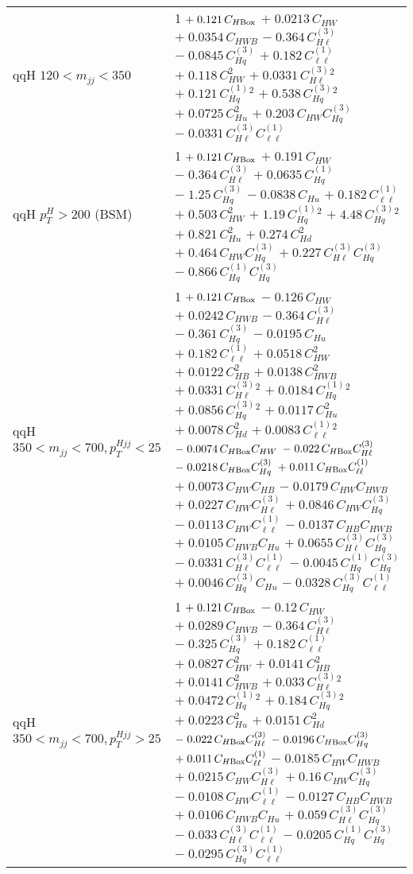 \begin{tabular}{l|p{}}
    qqH $120 < m_{jj} < 350$ & 1 $+\;0.121\,C_{H\rm{Box}}$ $+\;0.0213\,C_{HW}$ $+\;0.0354\,C_{HWB}$ $-\;0.364\,C^{(3)}_{H\ell}$ $-\;0.0845\,C^{(3)}_{Hq}$ $+\;0.182\,C^{(1)}_{\ell\ell}$ $+\;0.118\,C_{HW}^{2}$ $+\;0.0331\,C^{(3)}_{H\ell}^{2}$ $+\;0.121\,C^{(1)}_{Hq}^{2}$ $+\;0.538\,C^{(3)}_{Hq}^{2}$ $+\;0.0725\,C_{Hu}^{2}$ $+\;0.203\,C_{HW}C^{(3)}_{Hq}$ $-\;0.0331\,C^{(3)}_{H\ell}C^{(1)}_{\ell\ell}$ \\
    qqH $p_{T}^{H} > 200$ (BSM) & 1 $+\;0.121\,C_{H\rm{Box}}$ $+\;0.191\,C_{HW}$ $-\;0.364\,C^{(3)}_{H\ell}$ $+\;0.0635\,C^{(1)}_{Hq}$ $-\;1.25\,C^{(3)}_{Hq}$ $-\;0.0838\,C_{Hu}$ $+\;0.182\,C^{(1)}_{\ell\ell}$ $+\;0.503\,C_{HW}^{2}$ $+\;1.19\,C^{(1)}_{Hq}^{2}$ $+\;4.48\,C^{(3)}_{Hq}^{2}$ $+\;0.821\,C_{Hu}^{2}$ $+\;0.274\,C_{Hd}^{2}$ $+\;0.464\,C_{HW}C^{(3)}_{Hq}$ $+\;0.227\,C^{(3)}_{H\ell}C^{(3)}_{Hq}$ $-\;0.866\,C^{(1)}_{Hq}C^{(3)}_{Hq}$ \\
    qqH $350 < m_{jj} < 700, p_{T}^{Hjj} < 25$ & 1 $+\;0.121\,C_{H\rm{Box}}$ $-\;0.126\,C_{HW}$ $+\;0.0242\,C_{HWB}$ $-\;0.364\,C^{(3)}_{H\ell}$ $-\;0.361\,C^{(3)}_{Hq}$ $-\;0.0195\,C_{Hu}$ $+\;0.182\,C^{(1)}_{\ell\ell}$ $+\;0.0518\,C_{HW}^{2}$ $+\;0.0122\,C_{HB}^{2}$ $+\;0.0138\,C_{HWB}^{2}$ $+\;0.0331\,C^{(3)}_{H\ell}^{2}$ $+\;0.0184\,C^{(1)}_{Hq}^{2}$ $+\;0.0856\,C^{(3)}_{Hq}^{2}$ $+\;0.0117\,C_{Hu}^{2}$ $+\;0.0078\,C_{Hd}^{2}$ $+\;0.0083\,C^{(1)}_{\ell\ell}^{2}$ $-\;0.0074\,C_{H\rm{Box}}C_{HW}$ $-\;0.022\,C_{H\rm{Box}}C^{(3)}_{H\ell}$ $-\;0.0218\,C_{H\rm{Box}}C^{(3)}_{Hq}$ $+\;0.011\,C_{H\rm{Box}}C^{(1)}_{\ell\ell}$ $+\;0.0073\,C_{HW}C_{HB}$ $-\;0.0179\,C_{HW}C_{HWB}$ $+\;0.0227\,C_{HW}C^{(3)}_{H\ell}$ $+\;0.0846\,C_{HW}C^{(3)}_{Hq}$ $-\;0.0113\,C_{HW}C^{(1)}_{\ell\ell}$ $-\;0.0137\,C_{HB}C_{HWB}$ $+\;0.0105\,C_{HWB}C_{Hu}$ $+\;0.0655\,C^{(3)}_{H\ell}C^{(3)}_{Hq}$ $-\;0.0331\,C^{(3)}_{H\ell}C^{(1)}_{\ell\ell}$ $-\;0.0045\,C^{(1)}_{Hq}C^{(3)}_{Hq}$ $+\;0.0046\,C^{(3)}_{Hq}C_{Hu}$ $-\;0.0328\,C^{(3)}_{Hq}C^{(1)}_{\ell\ell}$ \\
    qqH $350 < m_{jj} < 700, p_{T}^{Hjj} > 25$ & 1 $+\;0.121\,C_{H\rm{Box}}$ $-\;0.12\,C_{HW}$ $+\;0.0289\,C_{HWB}$ $-\;0.364\,C^{(3)}_{H\ell}$ $-\;0.325\,C^{(3)}_{Hq}$ $+\;0.182\,C^{(1)}_{\ell\ell}$ $+\;0.0827\,C_{HW}^{2}$ $+\;0.0141\,C_{HB}^{2}$ $+\;0.0141\,C_{HWB}^{2}$ $+\;0.033\,C^{(3)}_{H\ell}^{2}$ $+\;0.0472\,C^{(1)}_{Hq}^{2}$ $+\;0.184\,C^{(3)}_{Hq}^{2}$ $+\;0.0223\,C_{Hu}^{2}$ $+\;0.0151\,C_{Hd}^{2}$ $-\;0.022\,C_{H\rm{Box}}C^{(3)}_{H\ell}$ $-\;0.0196\,C_{H\rm{Box}}C^{(3)}_{Hq}$ $+\;0.011\,C_{H\rm{Box}}C^{(1)}_{\ell\ell}$ $-\;0.0185\,C_{HW}C_{HWB}$ $+\;0.0215\,C_{HW}C^{(3)}_{H\ell}$ $+\;0.16\,C_{HW}C^{(3)}_{Hq}$ $-\;0.0108\,C_{HW}C^{(1)}_{\ell\ell}$ $-\;0.0127\,C_{HB}C_{HWB}$ $+\;0.0106\,C_{HWB}C_{Hu}$ $+\;0.059\,C^{(3)}_{H\ell}C^{(3)}_{Hq}$ $-\;0.033\,C^{(3)}_{H\ell}C^{(1)}_{\ell\ell}$ $-\;0.0205\,C^{(1)}_{Hq}C^{(3)}_{Hq}$ $-\;0.0295\,C^{(3)}_{Hq}C^{(1)}_{\ell\ell}$ \\

\end{tabular}
